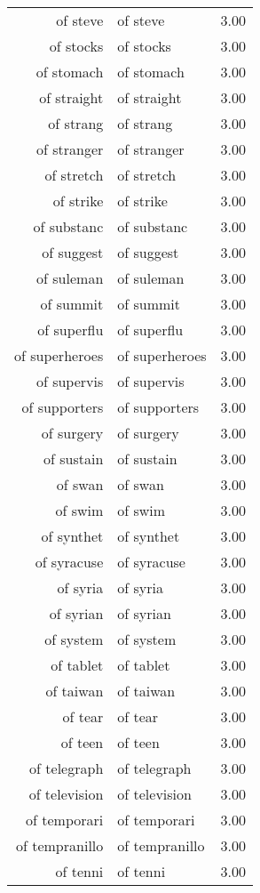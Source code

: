 \begin{table}[ht]
\begin{tabular}{rlr}
  of steve & of steve & 3.00 \\ 
  of stocks & of stocks & 3.00 \\ 
  of stomach & of stomach & 3.00 \\ 
  of straight & of straight & 3.00 \\ 
  of strang & of strang & 3.00 \\ 
  of stranger & of stranger & 3.00 \\ 
  of stretch & of stretch & 3.00 \\ 
  of strike & of strike & 3.00 \\ 
  of substanc & of substanc & 3.00 \\ 
  of suggest & of suggest & 3.00 \\ 
  of suleman & of suleman & 3.00 \\ 
  of summit & of summit & 3.00 \\ 
  of superflu & of superflu & 3.00 \\ 
  of superheroes & of superheroes & 3.00 \\ 
  of supervis & of supervis & 3.00 \\ 
  of supporters & of supporters & 3.00 \\ 
  of surgery & of surgery & 3.00 \\ 
  of sustain & of sustain & 3.00 \\ 
  of swan & of swan & 3.00 \\ 
  of swim & of swim & 3.00 \\ 
  of synthet & of synthet & 3.00 \\ 
  of syracuse & of syracuse & 3.00 \\ 
  of syria & of syria & 3.00 \\ 
  of syrian & of syrian & 3.00 \\ 
  of system & of system & 3.00 \\ 
  of tablet & of tablet & 3.00 \\ 
  of taiwan & of taiwan & 3.00 \\ 
  of tear & of tear & 3.00 \\ 
  of teen & of teen & 3.00 \\ 
  of telegraph & of telegraph & 3.00 \\ 
  of television & of television & 3.00 \\ 
  of temporari & of temporari & 3.00 \\ 
  of tempranillo & of tempranillo & 3.00 \\ 
  of tenni & of tenni & 3.00 \\ 

\end{tabular}
\end{table}
